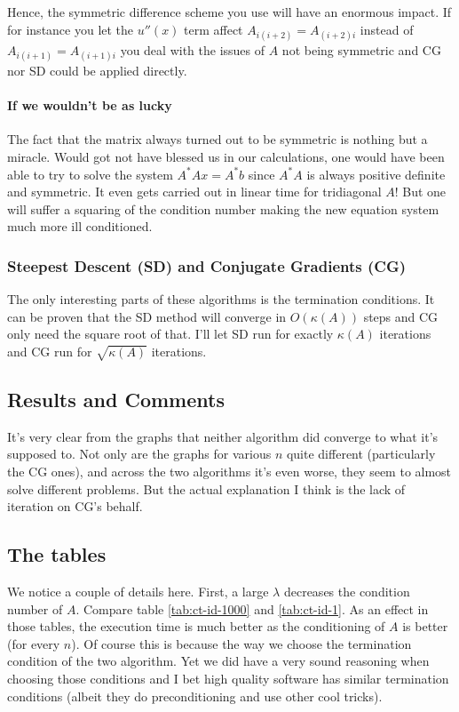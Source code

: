 \documentclass[a4paper,11pt]{article}
\begin{document}
Hence, the symmetric difference scheme you use will have an enormous
impact. If for instance you let the $u''(x)$ term affect
$A_{i(i+2)}=A_{(i+2)i}$ instead of $A_{i(i+1)}=A_{(i+1)i}$ you deal with
the issues of $A$ not being symmetric and CG nor SD could be applied
directly.

\paragraph{If we wouldn't be as lucky}

The fact that the matrix always turned out to be symmetric is nothing
but a miracle. Would got not have blessed us in our calculations, one
would have been able to try to solve the system $A^{*}Ax=A^{*}b$ since
$A^*A$ is always positive definite and symmetric.  It even gets carried
out in linear time for tridiagonal $A$! But one will suffer a squaring
of the condition number making the new equation system much more ill
conditioned.

\subsubsection{Steepest Descent (SD) and Conjugate Gradients (CG)}

The only interesting parts of these algorithms is the termination
conditions. It can be proven that the SD method will converge in
$O(\kappa(A))$ steps and CG only need the square root of that.
I'll let SD run for exactly $\kappa(A)$ iterations and CG run for
$\sqrt{\kappa(A)}$ iterations.

\subsection{Results and Comments}

It's very clear from the graphs that neither algorithm did converge to what
it's supposed to. Not only are the graphs for various $n$ quite different
(particularly the CG ones), and across the two algorithms it's even worse, they
seem to almost solve different problems. But the actual explanation I think is
the lack of iteration on CG's behalf.

\subsection{The tables}

We notice a couple of details here. First, a large $\lambda$ decreases the
condition number of $A$. Compare table \ref{tab:ct-id-1000} and
\ref{tab:ct-id-1}. As an effect in those tables, the execution time is
much better as the conditioning of $A$ is better (for every $n$). Of
course this is because the way we choose the termination condition of
the two algorithm. Yet we did have a very sound reasoning when choosing
those conditions and I bet high quality software has similar termination
conditions (albeit they do preconditioning and use other cool tricks).
\end{document}
